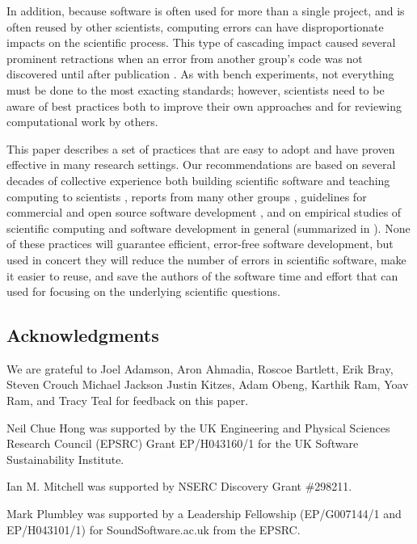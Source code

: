 \documentclass{article}
\begin{document}
In addition, because software is often used for more than a single
project, and is often reused by other scientists, computing errors can
have disproportionate impacts on the scientific process. This type of
cascading impact caused several prominent retractions when an error
from another group's code was not discovered until after publication
\cite{merali2010}.  As with bench experiments, not everything must be
done to the most exacting standards; however, scientists need to be
aware of best practices both to improve their own approaches and for
reviewing computational work by others.

This paper describes a set of practices that are easy to adopt and
have proven effective in many research settings.  Our recommendations
are based on several decades of collective experience both building
scientific software and teaching computing to scientists
\cite{aranda2012,wilson2006b}, reports from many other groups
\cite{heroux2009,kane2003,kane2006,killcoyne2009,matthews2008,pitt-francis2008,pouillon2010},
guidelines for commercial and open source software development
\cite{spolsky2000,fogel2005}, and on empirical studies of scientific
computing \cite{carver2007,kelly2009,segal2005,segal2008a} and
software development in general (summarized in \cite{oram2010}). None
of these practices will guarantee efficient, error-free software
development, but used in concert they will reduce the number of errors
in scientific software, make it easier to reuse, and save the authors
of the software time and effort that can used for focusing on the
underlying scientific questions.

\subsection*{Acknowledgments}

We are grateful to
Joel Adamson,
Aron Ahmadia,
Roscoe Bartlett,
Erik Bray,
Steven Crouch
Michael Jackson
Justin Kitzes,
Adam Obeng,
Karthik Ram,
Yoav Ram,
and Tracy Teal
for feedback on this paper.

Neil Chue Hong was supported by the UK Engineering and Physical
Sciences Research Council (EPSRC) Grant EP/H043160/1 for the UK
Software Sustainability Institute.

Ian M. Mitchell was supported by NSERC Discovery Grant \#298211.

Mark Plumbley was supported by a Leadership Fellowship (EP/G007144/1
and EP/H043101/1) for SoundSoftware.ac.uk from the EPSRC.
\end{document}
